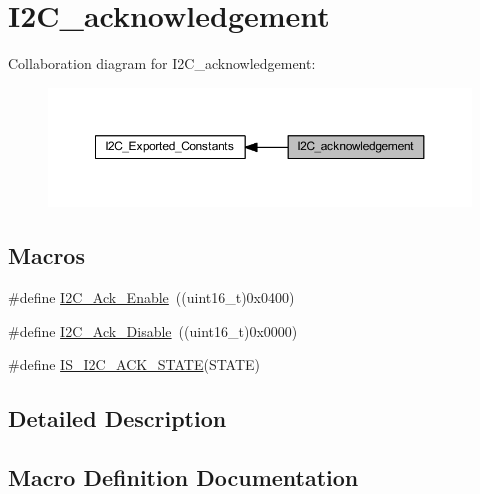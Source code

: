 \hypertarget{group___i2_c__acknowledgement}{}\section{I2\+C\+\_\+acknowledgement}
\label{group___i2_c__acknowledgement}
Collaboration diagram for I2\+C\+\_\+acknowledgement\+:
\nopagebreak
\begin{figure}[H]
\begin{center}
\leavevmode
\includegraphics[width=350pt]{group___i2_c__acknowledgement}
\end{center}
\end{figure}
\subsection*{Macros}
\begin{DoxyCompactItemize}
\item 
\#define \hyperlink{group___i2_c__acknowledgement_ga616466f8ef5a47237cdbf7ac578ec507}{I2\+C\+\_\+\+Ack\+\_\+\+Enable}~((uint16\+\_\+t)0x0400)
\item 
\#define \hyperlink{group___i2_c__acknowledgement_gadb5f47c052ac6bae1aa58c724e339e36}{I2\+C\+\_\+\+Ack\+\_\+\+Disable}~((uint16\+\_\+t)0x0000)
\item 
\#define \hyperlink{group___i2_c__acknowledgement_ga6401bedc842e784a2bb78b3aa21af19d}{I\+S\+\_\+\+I2\+C\+\_\+\+A\+C\+K\+\_\+\+S\+T\+A\+TE}(S\+T\+A\+TE)
\end{DoxyCompactItemize}


\subsection{Detailed Description}


\subsection{Macro Definition Documentation}
\mbox{\label{group___i2_c__acknowledgement_gadb5f47c052ac6bae1aa58c724e339e36}} 
